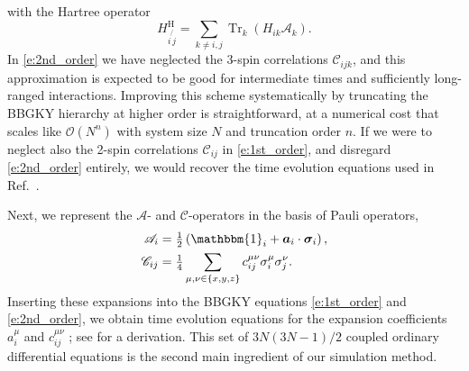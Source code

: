 \documentclass[aps,prl,showpacs,amsmath,amssymb,superscriptaddress,reprint,10pt]{revtex4-1}
\newcommand\id{{\mathbbm{1}}}
\newcommand{\mvec}[1]{\boldsymbol #1}
\DeclareMathOperator{\Tr}{{Tr}}
\begin{document}
with the Hartree operator
\begin{equation}
 H_{i\not{\,j}}^\text{H}=\sum_{k\neq i,j}\Tr_k\left(H_{ik} \mathscr{A}_k\right).
\end{equation}
In \eqref{e:2nd_order} we have neglected the 3-spin correlations $\mathscr{C}_{ijk}$, and this approximation is expected to be good for intermediate times and sufficiently long-ranged interactions. Improving this scheme systematically by truncating the BBGKY hierarchy at higher order is straightforward, at a numerical cost that scales like $\mathscr{O}\left(N^n\right)$ with system size $N$ and truncation order $n$. If we were to neglect also the 2-spin correlations $\mathscr{C}_{ij}$ in \eqref{e:1st_order}, and disregard \eqref{e:2nd_order} entirely, we would recover the time evolution equations used in Ref.~\cite{Schachenmayer_etal15}.

Next, we represent the $\mathscr{A}$- and $\mathscr{C}$-operators in the basis of Pauli operators,
\begin{subequations}
\begin{align}
\mathscr{A}_i &= \tfrac{1}{2}\left(\id_i+\mvec{a}_i\cdot\mvec{\sigma}_i\right),\label{e:Aexp}\\
\mathscr{C}_{ij} &= \tfrac{1}{4}\sum_{\mu,\nu\in\{x,y,z\}}c_{ij}^{\mu\nu}\sigma_i^\mu\sigma_j^\nu.\label{e:Cexp}
\end{align}
\end{subequations}
Inserting these expansions into the BBGKY equations \eqref{e:1st_order} and \eqref{e:2nd_order}, we obtain time evolution equations for the expansion coefficients $a_i^\mu$ and $c_{ij}^{\mu\nu}$ \cite{PaskauskasKastner12}; see \cite{Note1} for a derivation. This set of $3N(3N-1)/2$ coupled ordinary differential equations is the second main ingredient of our simulation method.
\end{document}
